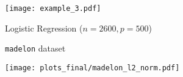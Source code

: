 \documentclass{beamer}
\begin{document}









\hspace{-3.3em}
\begin{frame}
  \vspace{-0.3em}
  \texttt{[image: example\_3.pdf]}
\end{frame}


\begin{frame}
  \begin{center}
    Logistic Regression ($n=2600, p=500$)

    \vspace{-0.5em}

    \texttt{madelon} dataset

    \vspace{0.5em}

    \texttt{[image: plots\_final/madelon\_l2\_norm.pdf]}
  \end{center}
\end{frame}
\end{document}
